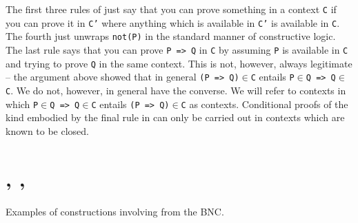 \documentclass[11pt,a4paper]{article}
\newcommand{\IN}{$\in$}
\begin{document}
The first three rules of  just say that you can
prove something in a context \texttt{C} if you can prove it in
\texttt{C'} where anything which is available in \texttt{C'} is
available in \texttt{C}. The fourth just unwraps \texttt{not(P)} in
the standard manner of constructive logic. The last rule says that you
can prove \texttt{P => Q} in \texttt{C} by assuming \texttt{P} is
available in \texttt{C} and trying to prove \texttt{Q} in the same
context. This is not, however, always legitimate -- the argument above
showed that in general \texttt{(P => Q){\IN}C} entails \texttt{P{\IN}Q =>
  Q{\IN}C}. We do not, however, in general have the converse. We will
refer to contexts in which \texttt{P{\IN}Q => Q{\IN}C} entails \texttt{(P =>
  Q){\IN}C} as  contexts. Conditional proofs of the kind
embodied by the final rule in  can only be
carried out in contexts which are known to be closed.


\newpage


\appendix
\newpage
\section{, , }\label{APP:ALL}

Examples of constructions involving  from the BNC.
\end{document}
